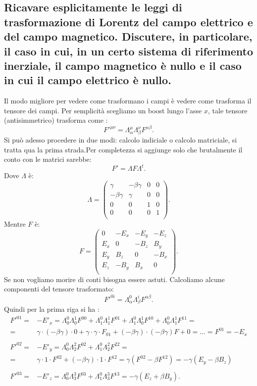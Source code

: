 \subsection[]{Ricavare esplicitamente le leggi di trasformazione di Lorentz del campo elettrico e del campo magnetico. Discutere, in particolare, il caso in cui, in un certo sistema di riferimento inerziale, il campo magnetico è nullo e il caso in cui il campo elettrico è nullo.}
\label{sec:3.b.4}
Il modo migliore per vedere come trasformano i campi è vedere come trasforma il tensore dei campi. Per semplicità scegliamo un boost lungo l'asse $x$, tale tensore (antisimmetrico) trasforma come :
\[
	F'^{\mu\nu}= \Lambda^{\mu}_{\alpha} \Lambda^{\nu}_{\beta} F^{\alpha\beta}
.\] 
Si può adesso procedere in due modi: calcolo indiciale o calcolo matriciale, si tratta qua la prima strada.Per completezza si aggiunge solo che brutalmente il conto con le matrici sarebbe:\[
	F'=\Lambda F \Lambda^{t}
.\] 
Dove $\Lambda$ è:
\[
	\Lambda = 
	\left( 
	\begin{array}{cccc}
		\gamma & -\beta\gamma & 0 & 0 \\   
		-\beta\gamma & \gamma & 0 & 0 \\
		0 & 0 & 1 & 0 \\
		0 & 0 & 0 & 1 \\
	\end{array}
	\right) 
.\]
Mentre $F$ è:
\[
	F = 
	\left( 
	\begin{array}{c|ccc}
		0 & -E_{x} & -E_{y} & -E_{z} \\   
		\hline
		E_{x} & 0 & -B_{z} & B_{y} \\
		E_{y} & B_{z} & 0 & -B_{x} \\
		E_{z} & -B_{y} & B_{x} & 0 \\
	\end{array}
	\right) 
.\] 
Se non vogliamo morire di conti bisogna essere astuti. Calcoliamo alcune componenti del tensore trasformato: \[
	F'^{0i}=\Lambda^{0}_{\alpha}\Lambda^{i}_{\beta}F^{\alpha\beta}
.\] 
Quindi per la prima riga si ha : 
\begin{align*}
	F'^{01}=& -E'_{x}= \Lambda^{0}_{0}\Lambda^{1}_{0}F^{00} + \Lambda^{0}_{1}\Lambda^{1}_{1}F^{01} + 
		\Lambda^{0}_{1}\Lambda^{1}_{0}F^{10} + \Lambda^{0}_{0}\Lambda^{1}_{1}F^{11}=\\
		=&\gamma\cdot \left( -\beta\gamma \right) \cdot 0 + \gamma \cdot \gamma \cdot F_{01} +
		\left( - \beta\gamma \right) \cdot \left( -\beta\gamma \right) F + 0 = \ldots = F^{01} = -E_{x}\\ 
		 & \\
	F'^{02}=&-E'_{y}= \Lambda^{0}_{0}\Lambda^2_2 F^{02} + \Lambda^0_1\Lambda^2_2 F^{22}=\\
		=&\gamma\cdot 1\cdot F^{02}+\left(-\beta\gamma\right)\cdot 1\cdot F^{12}=\gamma\left(F^{02}-\beta F^{12}\right)=-\gamma\left(E_{y}-\beta B_{z}\right)\\
		& \\
	F'^{03}=&-E'_{z}=\Lambda^{0}_{0}\Lambda^{3}_{3}F^{03}+\Lambda^{0}_{1}\Lambda^{3}_{3}F^{13}= -\gamma\left( E_{z}+\beta B_{y} \right) 
.\end{align*}
